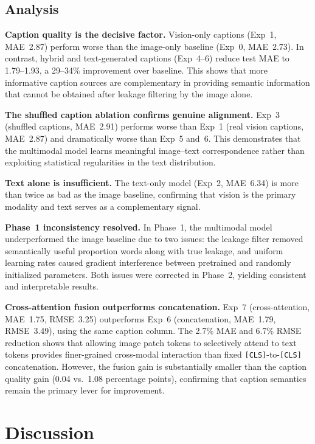 \documentclass[conference]{IEEEtran}
\begin{document}
\subsection{Analysis}

\textbf{Caption quality is the decisive factor.}
Vision-only captions (Exp~1, MAE~2.87) perform worse than the image-only baseline
(Exp~0, MAE~2.73). In contrast, hybrid and text-generated captions (Exp~4--6) reduce
test MAE to 1.79--1.93, a 29--34\% improvement over baseline. This shows that more
informative caption sources are complementary in providing semantic information that
cannot be obtained after leakage filtering by the image alone.

\textbf{The shuffled caption ablation confirms genuine alignment.}
Exp~3 (shuffled captions, MAE~2.91) performs worse than Exp~1 (real vision captions,
MAE~2.87) and dramatically worse than Exp~5 and~6. This demonstrates that the
multimodal model learns meaningful image--text correspondence rather than exploiting
statistical regularities in the text distribution.

\textbf{Text alone is insufficient.}
The text-only model (Exp~2, MAE~6.34) is more than twice as bad as the image baseline,
confirming that vision is the primary modality and text serves as a complementary signal.

\textbf{Phase~1 inconsistency resolved.}
In Phase~1, the multimodal model underperformed the image baseline due to two issues:
the leakage filter removed semantically useful proportion words along with true leakage,
and uniform learning rates caused gradient interference between pretrained and randomly
initialized parameters. Both issues were corrected in Phase~2, yielding consistent and
interpretable results.

\textbf{Cross-attention fusion outperforms concatenation.}
Exp~7 (cross-attention, MAE~1.75, RMSE~3.25) outperforms Exp~6 (concatenation,
MAE~1.79, RMSE~3.49), using the same caption column. The 2.7\% MAE and 6.7\% RMSE
reduction shows that allowing image patch tokens to selectively attend to text tokens
provides finer-grained cross-modal interaction than fixed \texttt{[CLS]}-to-\texttt{[CLS]}
concatenation. However, the fusion gain is substantially smaller than the caption
quality gain (0.04 vs.\ 1.08 percentage points), confirming that caption semantics
remain the primary lever for improvement.

\section{Discussion}
\end{document}
